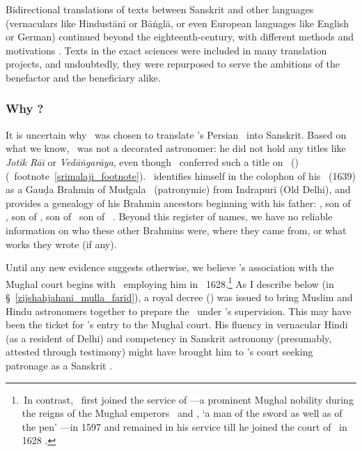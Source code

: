 Bidirectional translations of texts between Sanskrit and other languages (\eg vernaculars like Hindustānī or Bāṅglā, or even European languages like English or German) continued beyond the eighteenth-century, with different methods and motivations \parencites[\eg \vid][]{Dodsontranslation, Raina, Gallien}. Texts in the exact sciences were included in many translation projects, and undoubtedly, they were repurposed to serve the ambitions of the benefactor and the beneficiary alike.  

\subsubsection{Why \Nityananda?} \label{nityananda_bio}

It is uncertain why \Nityananda\ was chosen to translate \MullaFarid's Persian \ZijiShahJahani\ into Sanskrit. Based on what we know, \Nityananda\ was not a decorated astronomer: he did not hold any titles like \textit{Jotik Rāi} or \textit{Vedāṅgarāya}, even though  \Shahjahan\ conferred such a title on \VedangarayaMalajit\ () (\vid\ footnote~\ref{srimalaji_footnote}). \Nityananda\ identifies himself in the colophon of his \Sarvasiddhantaraja\ (1639) as a Gauḍa Brahmin of Mudgala \gotra\ (patronymic) from Indrapurī (Old Delhi), and provides a genealogy of his Brahmin ancestors beginning with his father: \Nityananda, son of \Devadatta, son of \Narayana, son of \Laksmana\ son of \IcchaDulinahatta\ \parencite[\eg \vid][228]{PetersonCatalogue}. Beyond this register of names, we have no reliable information on who these other Brahmins were, where they came from, or what works they wrote (if any).

Until any new evidence suggests otherwise, we believe \Nityananda's association with the Mughal court begins with \AsafKhanshort\ employing him in \circa \post\ 1628.\footnote{\,In contrast, \MullaFarid\ first joined the service of \KhanKhana---a prominent Mughal nobility
during the reigns of the Mughal emperors \Akbar\ and \Jahangir, `a man of the sword as well as of the pen' \parencite[75]{Lefevre}---in 1597 and remained in his service till he joined the court of \Shahjahan\ in 1628 \parencite[34]{Ghori}.} As I describe below (in  \S~\ref{zijshahjahani_mulla_farid}), a royal decree (\farman) was issued to bring Muslim and Hindu astronomers together to prepare the \ZijiShahJahani\ under \AsafKhanshort's supervision. This may have been the ticket for \Nityananda's entry to the Mughal court. His fluency in vernacular Hindi (as a resident of Delhi) and competency in Sanskrit astronomy (presumably, attested through testimony) might have brought him to \Shahjahan's court seeking patronage as a Sanskrit \jyotisa.
 
